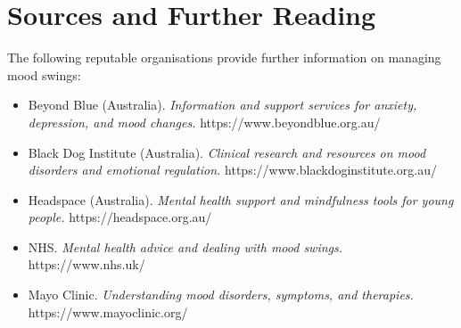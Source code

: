 \section*{Sources and Further Reading}
The following reputable organisations provide further information on managing mood swings:
\begin{itemize}
    \item Beyond Blue (Australia). \textit{Information and support services for anxiety, depression, and mood changes.} https://www.beyondblue.org.au/
    \item Black Dog Institute (Australia). \textit{Clinical research and resources on mood disorders and emotional regulation.} https://www.blackdoginstitute.org.au/
    \item Headspace (Australia). \textit{Mental health support and mindfulness tools for young people.} https://headspace.org.au/
    \item NHS. \textit{Mental health advice and dealing with mood swings.} https://www.nhs.uk/
    \item Mayo Clinic. \textit{Understanding mood disorders, symptoms, and therapies.} https://www.mayoclinic.org/
\end{itemize}
